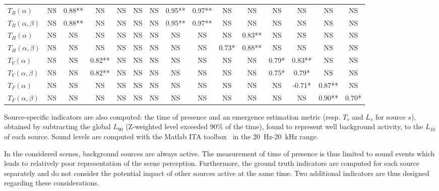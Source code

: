 \documentclass{article}
\begin{document}
\begin{sloppy}
\begin{table}[ht!]
{\begin{tabular}{ l | c c c c c c c c c c c c c c }
	$T_B(\alpha)$ & NS & 0.88** & NS & NS & NS & NS & 0.95** & 0.97** & NS & NS & NS & NS & NS & NS \\
	$T_B(\alpha, \beta)$ & NS & 0.88** & NS & NS & NS & NS & 0.95** & 0.97** & NS & NS & NS & NS & NS & NS \\ \hline
	$T_H(\alpha)$ & NS & NS & NS & NS & NS & NS & NS & NS & NS & 0.83** & NS & NS & NS & NS \\
	$T_H(\alpha, \beta)$ & NS & NS & NS & NS & NS & NS & NS & NS & 0.73* & 0.88** & NS & NS & NS & NS \\ \hline
	$T_V(\alpha)$ & NS & NS & 0.82** & NS & NS & NS & NS & NS & NS & NS & 0.79* & 0.83** & NS & NS \\
	$T_V(\alpha, \beta)$ & NS & NS & 0.82** & NS & NS & NS & NS & NS & NS & NS & 0.75* & 0.79* & NS & NS \\ \hline
	$T_F(\alpha)$ & NS & NS & NS & NS & NS & NS & NS & NS & NS & NS & NS & -0.71* & 0.87** & NS \\
	$T_F(\alpha, \beta)$ & NS & NS & NS & NS & NS & NS & NS & NS & NS & NS & NS & NS & 0.90** & 0.70* \\ \hline
\end{tabular}
}
\end{table}

Source-specific indicators are also computed: the time of presence and an emergence estimation metric (resp. $T_s$ and $L_s$ for source $s$), obtained by subtracting the global $L_{90}$ (Z-weighted level exceeded 90\% of the time), found to represent well background activity, to the $L_{10}$ of each source. Sound levels are computed with the Matlab ITA toolbox~\cite{itatoolbox2017} in the 20~Hz-20~kHz range.

In the considered scenes, background sources are always active. The measurement of time of presence is thus limited to sound events which leads to relatively poor representation of the scene perception. Furthermore, the ground truth indicators are computed for each source separately and do not consider the potential impact of other sources active at the same time. Two additional indicators are thus designed regarding these considerations.



\end{sloppy}
\end{document}
